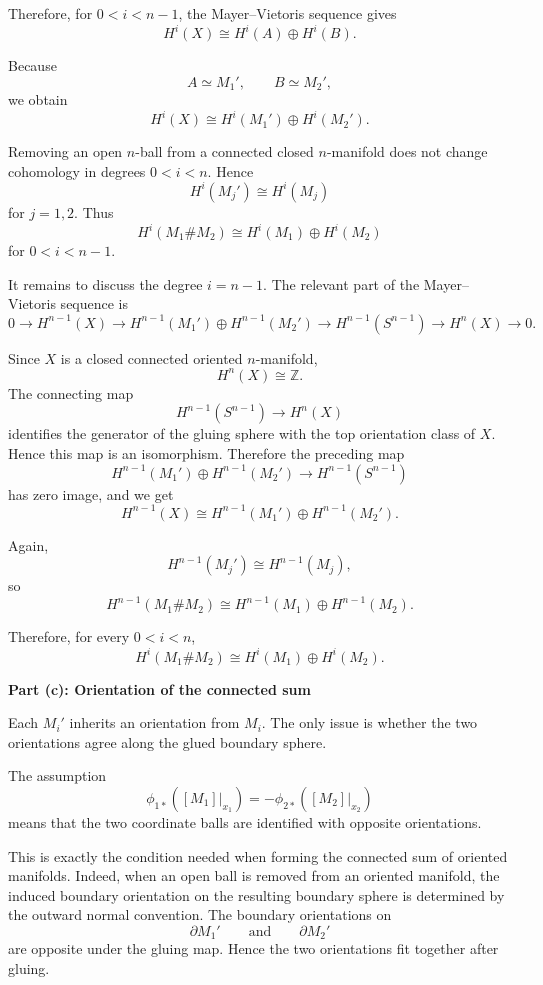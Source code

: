 \begin{solution}
Therefore, for \(0<i<n-1\), the Mayer--Vietoris sequence gives
\[
H^i(X)
\cong
H^i(A)\oplus H^i(B).
\]

Because
\[
A\simeq M_1',
\qquad
B\simeq M_2',
\]
we obtain
\[
H^i(X)
\cong
H^i(M_1')\oplus H^i(M_2').
\]

Removing an open \(n\)-ball from a connected closed \(n\)-manifold does not
change cohomology in degrees \(0<i<n\). Hence
\[
H^i(M_j')
\cong
H^i(M_j)
\]
for \(j=1,2\). Thus
\[
H^i(M_1\#M_2)
\cong
H^i(M_1)\oplus H^i(M_2)
\]
for \(0<i<n-1\).

It remains to discuss the degree \(i=n-1\). The relevant part of the
Mayer--Vietoris sequence is
\[
0
\longrightarrow
H^{n-1}(X)
\longrightarrow
H^{n-1}(M_1')\oplus H^{n-1}(M_2')
\longrightarrow
H^{n-1}(S^{n-1})
\longrightarrow
H^n(X)
\longrightarrow
0.
\]

Since \(X\) is a closed connected oriented \(n\)-manifold,
\[
H^n(X)\cong \mathbb{Z}.
\]
The connecting map
\[
H^{n-1}(S^{n-1})
\longrightarrow
H^n(X)
\]
identifies the generator of the gluing sphere with the top orientation
class of \(X\). Hence this map is an isomorphism. Therefore the preceding
map
\[
H^{n-1}(M_1')\oplus H^{n-1}(M_2')
\longrightarrow
H^{n-1}(S^{n-1})
\]
has zero image, and we get
\[
H^{n-1}(X)
\cong
H^{n-1}(M_1')\oplus H^{n-1}(M_2').
\]

Again,
\[
H^{n-1}(M_j')
\cong
H^{n-1}(M_j),
\]
so
\[
H^{n-1}(M_1\#M_2)
\cong
H^{n-1}(M_1)\oplus H^{n-1}(M_2).
\]

Therefore, for every \(0<i<n\),
\[
\boxed{
	H^i(M_1\#M_2)
	\cong
	H^i(M_1)\oplus H^i(M_2).
}
\]


\medskip
\noindent\textbf{Part (c): Orientation of the connected sum}\par
\smallskip


Each \(M_i'\) inherits an orientation from \(M_i\). The only issue is whether
the two orientations agree along the glued boundary sphere.

The assumption
\[
\phi_{1*}([M_1]|_{x_1})
=
-\phi_{2*}([M_2]|_{x_2})
\]
means that the two coordinate balls are identified with opposite
orientations.

This is exactly the condition needed when forming the connected sum of
oriented manifolds. Indeed, when an open ball is removed from an oriented
manifold, the induced boundary orientation on the resulting boundary sphere
is determined by the outward normal convention. The boundary orientations on
\[
\partial M_1'
\qquad\text{and}\qquad
\partial M_2'
\]
are opposite under the gluing map. Hence the two orientations fit together
after gluing.


\end{solution}
